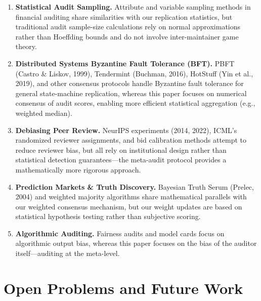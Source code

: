 \documentclass[11pt,a4paper]{article}
\theoremstyle{definition}
\begin{document}
\begin{enumerate}[leftmargin=*, label=\arabic*.]
    \item \textbf{Statistical Audit Sampling.} Attribute and variable sampling methods in financial auditing share similarities with our replication statistics, but traditional audit sample-size calculations rely on normal approximations rather than Hoeffding bounds and do not involve inter-maintainer game theory.
    \item \textbf{Distributed Systems Byzantine Fault Tolerance (BFT).} PBFT (Castro \& Liskov, 1999), Tendermint (Buchman, 2016), HotStuff (Yin et al., 2019), and other consensus protocols handle Byzantine fault tolerance for general state-machine replication, whereas this paper focuses on numerical consensus of audit scores, enabling more efficient statistical aggregation (e.g., weighted median).
    \item \textbf{Debiasing Peer Review.} NeurIPS experiments (2014, 2022), ICML's randomized reviewer assignments, and bid calibration methods attempt to reduce reviewer bias, but all rely on institutional design rather than statistical detection guarantees---the meta-audit protocol provides a mathematically more rigorous approach.
    \item \textbf{Prediction Markets \& Truth Discovery.} Bayesian Truth Serum (Prelec, 2004) and weighted majority algorithms share mathematical parallels with our weighted consensus mechanism, but our weight updates are based on statistical hypothesis testing rather than subjective scoring.
    \item \textbf{Algorithmic Auditing.} Fairness audits and model cards focus on algorithmic output bias, whereas this paper focuses on the bias of the auditor itself---auditing at the meta-level.
\end{enumerate}

\section{Open Problems and Future Work}
\end{document}
